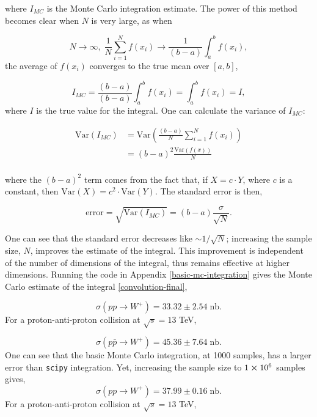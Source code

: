 \documentclass[a4paper,11pt]{article}
\begin{document}
where $I_{MC}$ is the Monte Carlo integration estimate\cite{a2025_4}. The power of this method becomes clear when $N$ is very large, as when

$$
N \rightarrow \infty,\;  \frac{1}{N}\sum_{i=1}^{N}f(x_i) \rightarrow  \frac{1}{(b-a)}\int_a^b f(x_i),
$$
the average of $f(x_i)$ converges to the true mean over $[a,b]$,

$$
I_{MC} = \frac{(b-a)}{(b-a)}\int_a^b f(x_i) = \int_a^b f(x_i) = I,
$$
where $I$ is the true value for the integral. One can calculate the variance of $I_{MC}$:


\begin{equation*}
	\begin{aligned}
		\text{Var}(I_{MC}) &= \text{Var}\left(\frac{(b-a)}{N}\sum_{i=1}^{N}f(x_i)\right)\\ 
		&= (b-a)^2 \frac{\text{Var}(f(x))}{N}\\
	\end{aligned}
\end{equation*}

where the $(b-a)^2$ term comes from the fact that, if $X = c \cdot Y$, where $c$ is a constant, then $\text{Var}(X) = c^2 \cdot \text{Var}(Y)$. The standard error is then,

\begin{equation}
	\text{error} = \sqrt{	\text{Var}(I_{MC})} = (b-a)\frac{\sigma}{\sqrt{N}}.
\end{equation}


One can see that the standard error decreases like $\sim 1/\sqrt{N}$; increasing the sample size, $N$, improves the estimate of the integral. This improvement is independent of the number of dimensions of the integral, thus remains effective at higher dimensions. Running the code in Appendix \ref{basic-mc-integration} gives the Monte Carlo estimate of the integral \ref{convolution-final},

$$
\sigma(pp \rightarrow W^+) = 33.32 \pm 2.54\; \text{nb}.
$$
For a proton-anti-proton collision at $\sqrt{s} = 13$ TeV,

$$
\sigma(p\bar{p} \rightarrow W^+) = 45.36 \pm 7.64 \; \text{nb}.
$$
One can see that the basic Monte Carlo integration, at 1000 samples, has a larger error than \texttt{scipy} integration. Yet, increasing the sample size to $1\cross10^6$ samples gives, 
$$
\sigma(pp \rightarrow W^+) = 37.99 \pm 0.16\; \text{nb}.
$$
For a proton-anti-proton collision at $\sqrt{s} = 13$ TeV,
\end{document}
